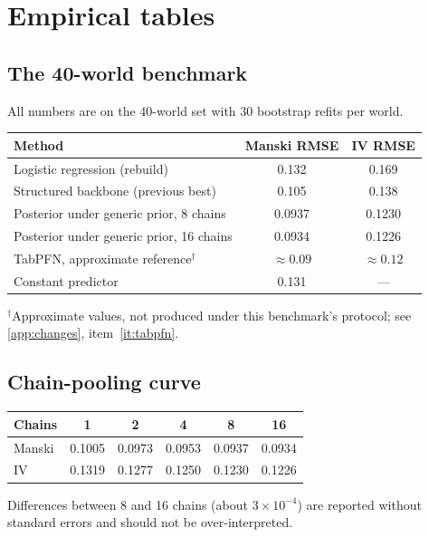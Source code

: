 \documentclass[11pt]{article}
\theoremstyle{definition}
\theoremstyle{remark}
\begin{document}
\appendix

\section{Empirical tables}\label{app:empirical}

\subsection{The 40-world benchmark}
All numbers are on the 40-world set with 30 bootstrap refits per world.

\begin{center}
\begin{tabular}{@{}lcc@{}}
\toprule
Method & Manski RMSE & IV RMSE\\
\midrule
Logistic regression (rebuild) & 0.132 & 0.169\\
Structured backbone (previous best) & 0.105 & 0.138\\
Posterior under generic prior, 8 chains & 0.0937 & 0.1230\\
Posterior under generic prior, 16 chains & 0.0934 & 0.1226\\
TabPFN, approximate reference$^{\dagger}$ & $\approx0.09$ & $\approx0.12$\\
Constant predictor & 0.131 & ---\\
\bottomrule
\end{tabular}
\end{center}
{\small $^\dagger$Approximate values, not produced under this benchmark's protocol; see
\cref{app:changes}, item~\ref{it:tabpfn}.}

\subsection{Chain-pooling curve}
\begin{center}
\begin{tabular}{@{}lccccc@{}}
\toprule
Chains & 1 & 2 & 4 & 8 & 16\\
\midrule
Manski & 0.1005 & 0.0973 & 0.0953 & 0.0937 & 0.0934\\
IV & 0.1319 & 0.1277 & 0.1250 & 0.1230 & 0.1226\\
\bottomrule
\end{tabular}
\end{center}
Differences between 8 and 16 chains (about $3\times10^{-4}$) are reported without standard errors and
should not be over-interpreted.
\end{document}
